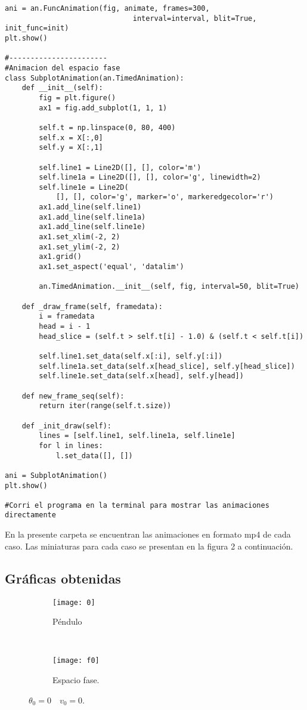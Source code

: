 \documentclass[12pt]{article}
\begin{document}
{\begin{verbatim}
ani = an.FuncAnimation(fig, animate, frames=300,
                              interval=interval, blit=True, init_func=init)
plt.show()

#-----------------------
#Animacion del espacio fase
class SubplotAnimation(an.TimedAnimation):
    def __init__(self):
        fig = plt.figure()
        ax1 = fig.add_subplot(1, 1, 1)
       
        self.t = np.linspace(0, 80, 400)
        self.x = X[:,0]
        self.y = X[:,1]

        self.line1 = Line2D([], [], color='m')
        self.line1a = Line2D([], [], color='g', linewidth=2)
        self.line1e = Line2D(
            [], [], color='g', marker='o', markeredgecolor='r')
        ax1.add_line(self.line1)
        ax1.add_line(self.line1a)
        ax1.add_line(self.line1e)
        ax1.set_xlim(-2, 2)
        ax1.set_ylim(-2, 2)
        ax1.grid()
        ax1.set_aspect('equal', 'datalim')

        an.TimedAnimation.__init__(self, fig, interval=50, blit=True)

    def _draw_frame(self, framedata):
        i = framedata
        head = i - 1
        head_slice = (self.t > self.t[i] - 1.0) & (self.t < self.t[i])

        self.line1.set_data(self.x[:i], self.y[:i])
        self.line1a.set_data(self.x[head_slice], self.y[head_slice])
        self.line1e.set_data(self.x[head], self.y[head])

    def new_frame_seq(self):
        return iter(range(self.t.size))

    def _init_draw(self):
        lines = [self.line1, self.line1a, self.line1e]
        for l in lines:
            l.set_data([], [])

ani = SubplotAnimation()
plt.show()

#Corri el programa en la terminal para mostrar las animaciones directamente
\end{verbatim}}

En la presente carpeta se encuentran las animaciones en formato mp4 de cada caso. Las miniaturas para cada caso se presentan en la figura 2 a continuación.

\subsection*{Gráficas obtenidas}

\begin{figure}[H]
    \centering
    \begin{subfigure}[b]{0.4\textwidth}
    \centering
        \texttt{[image: 0]}
        \caption{Péndulo}
    \end{subfigure}
    ~ 
    \begin{subfigure}[b]{0.4\textwidth}
    \centering
        \texttt{[image: f0]}
        \caption{Espacio fase.}
    \end{subfigure}
    \caption{$\theta_0=0 \quad v_0=0$.}
\end{figure}
\end{document}
